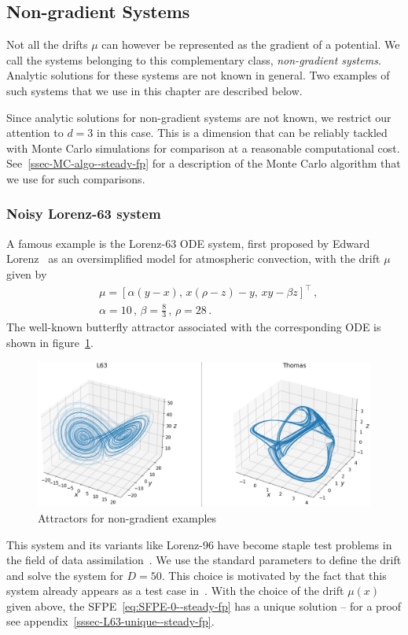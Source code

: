 \subsection{Non-gradient Systems}
Not all the drifts $\mu$ can however be represented as the gradient of a potential. We call the systems belonging to this complementary class, \textit{non-gradient systems}. Analytic solutions for these systems are not known in general. Two examples of such systems that we use in this chapter are described below.

Since analytic solutions for non-gradient systems are not known, we restrict our attention to $d=3$ in this case. This is a dimension that can be reliably tackled with Monte Carlo simulations for comparison at a reasonable computational cost. See~\ref{ssec-MC-algo--steady-fp} for a description of the Monte Carlo algorithm that we use for such comparisons.

\subsubsection{Noisy Lorenz-63 system}
A famous example is the Lorenz-63 ODE system, first proposed by Edward Lorenz~\cite{lorenz1963deterministic} as an oversimplified model for atmospheric convection, with the drift $\mu$ given by
\begin{align}
    &\mu=[\alpha (y-x),\, x(\rho-z) - y,\, xy - \beta z]^\top \,, \label{eq:mu-L63--steady-fp}\\
    &\alpha = 10 \,, \, \beta = \frac{8}{3}\,, \, \rho=28 \,.
\end{align}
The well-known butterfly attractor associated with the corresponding ODE is shown in figure~\ref{fig:attractors--steady-fp}. 
\begin{figure}[t!]
    \centering\includegraphics[scale=0.55]{steady-fp/plots/attractor.png}
   \caption{Attractors for non-gradient examples} \label{fig:attractors--steady-fp}
\end{figure}
This system and its variants like Lorenz-96 have become staple test problems in the field of data assimilation~\cite{carrassi2022data, yeong2020particle}. We use the standard parameters to define the drift and solve the system for $D=50$. This choice is motivated by the fact that this system already appears as a test case in~\cite{chen2018efficient}. With the choice of the drift $\mu(x)$ given above, the SFPE~\eqref{eq:SFPE-0--steady-fp} has a unique solution -- for a proof see appendix~\ref{sssec-L63-unique--steady-fp}.

